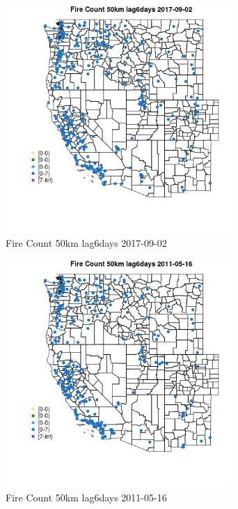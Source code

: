 \begin{figure} 
\centering  
\includegraphics[width=0.77\textwidth]{Code_Outputs/Report_ML_input_PM25_Step4_part_e_de_duplicated_aves_compiled_2019-05-20wNAs_MapObsFire_Count_50km_lag6days2017-09-02.jpg} 
\caption{\label{fig:Report_ML_input_PM25_Step4_part_e_de_duplicated_aves_compiled_2019-05-20wNAsMapObsFire_Count_50km_lag6days2017-09-02}Fire Count 50km lag6days 2017-09-02} 
\end{figure} 
 

\clearpage 

\begin{figure} 
\centering  
\includegraphics[width=0.77\textwidth]{Code_Outputs/Report_ML_input_PM25_Step4_part_e_de_duplicated_aves_compiled_2019-05-20wNAs_MapObsFire_Count_50km_lag6days2011-05-16.jpg} 
\caption{\label{fig:Report_ML_input_PM25_Step4_part_e_de_duplicated_aves_compiled_2019-05-20wNAsMapObsFire_Count_50km_lag6days2011-05-16}Fire Count 50km lag6days 2011-05-16} 
\end{figure} 
 

